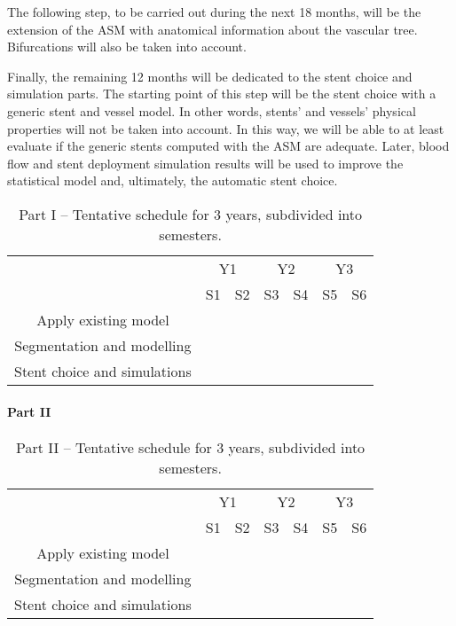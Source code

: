The following step, to be carried out during the next 18 months, will be the extension of the ASM with anatomical information about the vascular tree. Bifurcations will also be taken into account. 

Finally, the remaining 12 months will be dedicated to the stent choice and simulation parts. The starting point of this step will be the stent choice with a generic stent and vessel model. In other words, stents' and vessels' physical properties will not be taken into account. In this way, we will be able to at least evaluate if the generic stents computed with the ASM are adequate. Later, blood flow and stent deployment simulation results will be used to improve the statistical model and, ultimately, the automatic stent choice.  

\begin{table}[h]\centering
\begin{tabular}{c|c|c|c|c|c|c|}
\cline{2-7}
 & \multicolumn{2}{|c|}{Y1} & \multicolumn{2}{|c|}{Y2} & \multicolumn{2}{|c|}{Y3} \\ \cline{2-7}
 & S1 & S2 & S3 & S4 & S5 & S6 \\ \hline
\multicolumn{1}{|c|}{Apply existing model} & \cellcolor{green} & & & & & \\ \hline
\multicolumn{1}{|c|}{Segmentation and modelling} & & \cellcolor{green} & \cellcolor{green} & \cellcolor{green} & & \\ \hline
\multicolumn{1}{|c|}{Stent choice and simulations} & & & & & \cellcolor{green} & \cellcolor{green} \\ \hline
\end{tabular}
\caption{Part I -- Tentative schedule for 3 years, subdivided into semesters.}
\label{tab:schedule1}
\end{table}

\paragraph{Part II}

\begin{table}[h]\centering
\begin{tabular}{c|c|c|c|c|c|c|}
\cline{2-7}
 & \multicolumn{2}{|c|}{Y1} & \multicolumn{2}{|c|}{Y2} & \multicolumn{2}{|c|}{Y3} \\ \cline{2-7}
 & S1 & S2 & S3 & S4 & S5 & S6 \\ \hline
\multicolumn{1}{|c|}{Apply existing model} & \cellcolor{green} & & & & & \\ \hline
\multicolumn{1}{|c|}{Segmentation and modelling} & & \cellcolor{green} & \cellcolor{green} & \cellcolor{green} & & \\ \hline
\multicolumn{1}{|c|}{Stent choice and simulations} & & & & & \cellcolor{green} & \cellcolor{green} \\ \hline
\end{tabular}
\caption{Part II -- Tentative schedule for 3 years, subdivided into semesters.}
\label{tab:schedule2}
\end{table}


